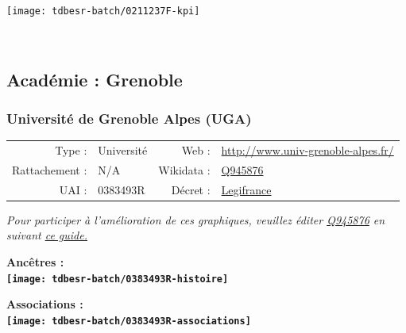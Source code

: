 \documentclass[12pt,french,]{article}
\begin{document}
\begin{center}\texttt{[image: tdbesr-batch/0211237F-kpi]} \end{center}\checkoddpage

\ifoddpage ~\newpage \fi   

\hypertarget{acaduxe9mie-grenoble}{%
\subsection{Académie : Grenoble}\label{acaduxe9mie-grenoble}}

\hypertarget{universituxe9-de-grenoble-alpes-uga}{%
\subsubsection{Université de Grenoble Alpes
(UGA)}\label{universituxe9-de-grenoble-alpes-uga}}

\begin{tabular*}{\textwidth}{rp{5cm}rl}  
\hline  
Type : & Université & Web : &\href{http://www.univ-grenoble-alpes.fr/}{http://www.univ-grenoble-alpes.fr/} \\  
Rattachement : & N/A & Wikidata : & \href{https://www.wikidata.org/entity/Q945876}{Q945876} \\  
UAI : & 0383493R & Décret : & \href{http://legifrance.gouv.fr/affichTexte.do?cidTexte=JORFTEXT000031147890&dateTexte=&categorieLien=id}{Legifrance} \\  
\hline  
\end{tabular*}

\textit{\scriptsize Pour participer à l'amélioration de ces graphiques, veuillez éditer  \href{https://www.wikidata.org/entity/Q945876}{Q945876}  en suivant \href{https://github.com/cpesr/wikidataESR/blob/master/Rmd/wikidataESR.md}{ce guide.}}

\vspace{1cm}  
\begin{minipage}[b]{0.50\textwidth}\begin{center} \bf Ancêtres : \\  
\texttt{[image: tdbesr-batch/0383493R-histoire]} \end{center}\end{minipage}\begin{minipage}[b]{0.50\textwidth}\begin{center} \bf Associations : \\  
\texttt{[image: tdbesr-batch/0383493R-associations]} \end{center}\end{minipage}
\end{document}
